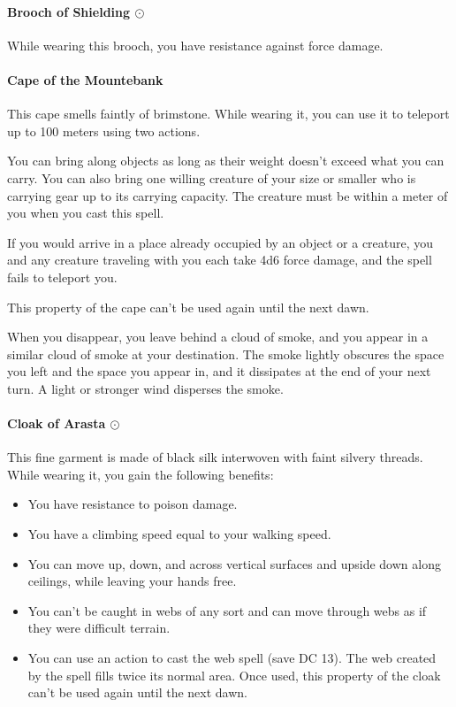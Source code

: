     \paragraph{Brooch of Shielding $\odot$}
        While wearing this brooch, you have resistance against force damage.
    \paragraph{Cape of the Mountebank}
        This cape smells faintly of brimstone.
        While wearing it, you can use it to teleport up to 100 meters using two actions.

        You can bring along objects as long as their weight doesn't exceed what you can carry.
        You can also bring one willing creature of your size or smaller who is carrying gear up to its carrying capacity.
        The creature must be within a meter of you when you cast this spell.

        If you would arrive in a place already occupied by an object or a creature, you and any creature traveling with you each take 4d6 force damage, and the spell fails to teleport you.

        This property of the cape can't be used again until the next dawn.

        When you disappear, you leave behind a cloud of smoke, and you appear in a similar cloud of smoke at your destination.
        The smoke lightly obscures the space you left and the space you appear in, and it dissipates at the end of your next turn. A light or stronger wind disperses the smoke.
    \paragraph{Cloak of Arasta $\odot$}
        This fine garment is made of black silk interwoven with faint silvery threads.
        While wearing it, you gain the following benefits:
        \begin{itemize}
            \item You have resistance to poison damage.
            \item You have a climbing speed equal to your walking speed.
            \item You can move up, down, and across vertical surfaces and upside down along ceilings, while leaving your hands free.
            \item You can't be caught in webs of any sort and can move through webs as if they were difficult terrain.
            \item You can use an action to cast the web spell (save DC 13).
            The web created by the spell fills twice its normal area.
            Once used, this property of the cloak can't be used again until the next dawn.
        \end{itemize}

